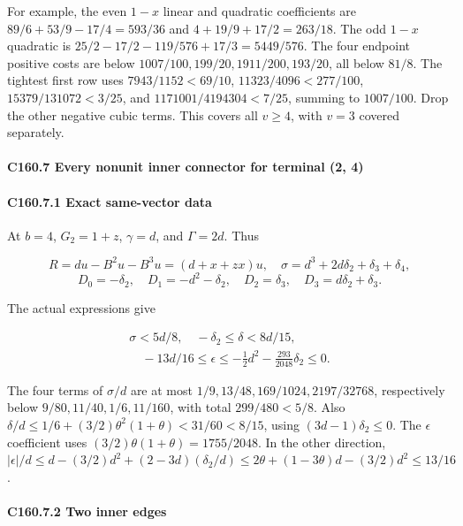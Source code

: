 For example, the even \(1-x\) linear and quadratic coefficients are \(89/6+53/9-17/4=593/36\) and \(4+19/9+17/2=263/18\). The odd \(1-x\) quadratic is \(25/2-17/2-119/576+17/3=5449/576\). The four endpoint positive costs are below \(1007/100,\allowbreak \allowbreak  199/20,\allowbreak \allowbreak  1911/200,\allowbreak \allowbreak  193/20\), all below \(81/8\). The tightest first row uses \(7943/1152<69/10\), \(11323/4096<277/100\), \(15379/131072<3/25\), and \(1171001/4194304<7/25\), summing to \(1007/100\). Drop the other negative cubic terms. This covers all \(v\ge4\), with \(v=3\) covered separately.

\paragraph{C160.7 Every nonunit inner connector for terminal (2, 4)}

\paragraph{C160.7.1 Exact same-vector data}

At \(b=4\), \(G_2=1+z\), \(\gamma=d\), and \(\Gamma=2d\). Thus

\[
R=d u-B^2u-B^3u=(d+x+zx)u,
\quad \sigma=d^3+2d\delta_2+\delta_3+\delta_4,
\]
\[
D_0=-\delta_2,\quad D_1=-d^2-\delta_2,\quad D_2=\delta_3,\quad D_3=d\delta_2+\delta_3.
\]

The actual expressions give

\[
\begin{gathered}
\sigma<5d/8,\quad -\delta_2\le\delta<8d/15,\\
\quad -13d/16\le\epsilon\le-\tfrac12d^2-\tfrac{293}{2048}\delta_2\le0.
\end{gathered}
\]

The four terms of \(\sigma/d\) are at most \(1/9,\allowbreak \allowbreak  13/48,\allowbreak \allowbreak  169/1024,\allowbreak \allowbreak  2197/32768\), respectively below \(9/80,\allowbreak \allowbreak  11/40,\allowbreak \allowbreak  1/6,\allowbreak \allowbreak  11/160\), with total \(299/480<5/8\). Also \(\delta/d\le1/6+(3/2)\theta^2(1+\theta)<31/60<8/15\), using \((3d-1)\delta_2\le0\). The \(\epsilon\) coefficient uses \((3/2)\theta(1+\theta)=1755/2048\). In the other direction, \(|\epsilon|/d\le d-(3/2)d^2+(2-3d)(\delta_2/d)\le2\theta+(1-3\theta)d-(3/2)d^2\le13/16\).

\paragraph{C160.7.2 Two inner edges}

